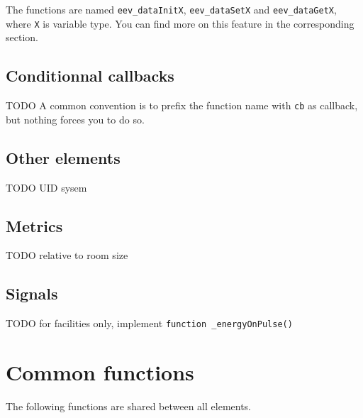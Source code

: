 \documentclass[10pt,a4paper]{scrartcl}
\begin{document}
The functions are named \verb#eev_dataInitX#, \verb#eev_dataSetX# and \verb#eev_dataGetX#, where \verb#X# is variable type. You can find more on this feature in the corresponding section.

\subsection{Conditionnal callbacks}
TODO A common convention is to prefix the function name with \texttt{cb} as callback, but nothing forces you to do so.

\subsection{Other elements}
TODO UID sysem

\subsection{Metrics}
TODO relative to room size

\subsection{Signals}
TODO for facilities only, implement \texttt{function _energyOnPulse()}

\newpage
\section{Common functions}
The following functions are shared between all elements.
\end{document}
